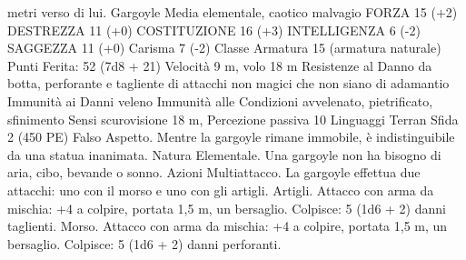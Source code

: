 \begin{multicols}{2}
metri verso di lui.
Gargoyle
Media elementale, caotico malvagio
FORZA 15 (+2)
DESTREZZA 11 (+0)
COSTITUZIONE 16 (+3)
INTELLIGENZA 6 (-2)
SAGGEZZA 11 (+0)
Carisma 7 (-2)
Classe Armatura 15 (armatura naturale)
\hspace*{0pt}\hfill{Punti Ferita}: 52 (7d8 + 21)
Velocità 9 m, volo 18 m
Resistenze al Danno da botta, perforante e tagliente di
attacchi non magici che non siano di adamantio
Immunità ai Danni veleno
Immunità alle Condizioni avvelenato, pietrificato, sfinimento
Sensi scurovisione 18 m, Percezione passiva 10
Linguaggi Terran
Sfida 2 (450 PE)
Falso Aspetto. Mentre la gargoyle rimane immobile, è
indistinguibile da una statua inanimata.
Natura Elementale. Una gargoyle non ha bisogno di aria, cibo,
bevande o sonno.
Azioni
Multiattacco. La gargoyle effettua due attacchi: uno con il morso
e uno con gli artigli.
Artigli. Attacco con arma da mischia: +4 a colpire, portata 1,5
m, un bersaglio.
Colpisce: 5 (1d6 + 2) danni taglienti.
Morso. Attacco con arma da mischia: +4 a colpire, portata 1,5
m, un bersaglio.
Colpisce: 5 (1d6 + 2) danni perforanti.
 

\end{multicols}
